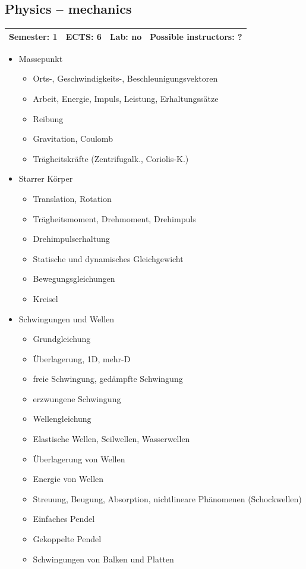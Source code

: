 \documentclass[12pt,twoside,fleqn,a4paper]{article}
\begin{document}
\subsection{Physics -- mechanics}
\begin{tabular}{llll} \hline
\textbf{Semester:} 1 & \textbf{ECTS:} 6 & \textbf{Lab:} no & \textbf{Possible instructors:} ?\\
\hline
\end{tabular}

\begin{itemize}
\setlength\itemsep{0cm}
\item Massepunkt
\begin{itemize}
\item Orts-, Geschwindigkeits-, Beschleunigungsvektoren
\item Arbeit, Energie, Impuls, Leistung, Erhaltungssätze
\item Reibung
\item Gravitation, Coulomb
\item Trägheitskräfte (Zentrifugalk., Coriolis-K.)
\end{itemize}

\item Starrer Körper
\begin{itemize}
\item Translation, Rotation
\item Trägheitsmoment, Drehmoment, Drehimpuls
\item Drehimpulserhaltung
\item Statische und dynamisches Gleichgewicht
\item Bewegungsgleichungen 
\item Kreisel
\end{itemize}

\item Schwingungen und Wellen
\begin{itemize}
\item Grundgleichung
\item Überlagerung, 1D, mehr-D
\item freie Schwingung, gedämpfte Schwingung
\item erzwungene Schwingung
\item Wellengleichung
\item Elastische Wellen, Seilwellen, Wasserwellen
\item Überlagerung von Wellen
\item Energie von Wellen
\item Streuung, Beugung, Absorption, nichtlineare Phänomenen (Schockwellen)
\item Einfaches Pendel
\item Gekoppelte Pendel
\item Schwingungen von Balken und Platten
\end{itemize}
\end{itemize}
\end{document}
